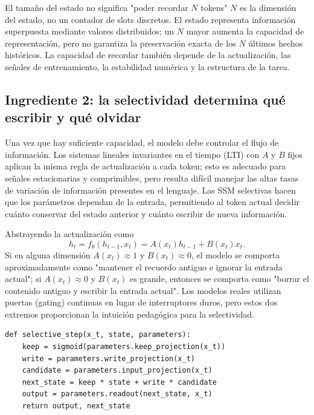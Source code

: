 \begin{knowledgebox}{El tamaño del estado no significa "poder recordar $N$ tokens"}
$N$ es la dimensión del estado, no un contador de slots discretos. El estado representa información superpuesta mediante valores distribuidos; un $N$ mayor aumenta la capacidad de representación, pero no garantiza la preservación exacta de los $N$ últimos hechos históricos. La capacidad de recordar también depende de la actualización, las señales de entrenamiento, la estabilidad numérica y la estructura de la tarea.
\end{knowledgebox}

\subsection{Ingrediente 2: la selectividad determina qué escribir y qué olvidar}

Una vez que hay suficiente capacidad, el modelo debe controlar el flujo de información. Los sistemas lineales invariantes en el tiempo (LTI) con $A$ y $B$ fijos aplican la misma regla de actualización a cada token; esto es adecuado para señales estacionarias y comprimibles, pero resulta difícil manejar las altas tasas de variación de información presentes en el lenguaje. Las SSM selectivas hacen que los parámetros dependan de la entrada, permitiendo al token actual decidir cuánto conservar del estado anterior y cuánto escribir de nueva información.


Abstrayendo la actualización como
\[
h_t=f_\theta(h_{t-1},x_t)
=A(x_t)h_{t-1}+B(x_t)x_t.
\]
Si en alguna dimensión $A(x_t)\approx 1$ y $B(x_t)\approx 0$, el modelo se comporta aproximadamente como "mantener el recuerdo antiguo e ignorar la entrada actual"; si $A(x_t)\approx 0$ y $B(x_t)$ es grande, entonces se comporta como "borrar el contenido antiguo y escribir la entrada actual". Los modelos reales utilizan puertas (gating) continuas en lugar de interruptores duros, pero estos dos extremos proporcionan la intuición pedagógica para la selectividad.

\begin{lstlisting}[caption={Pseudocódigo didáctico de la actualización recurrente selectiva}]
def selective_step(x_t, state, parameters):
    keep = sigmoid(parameters.keep_projection(x_t))
    write = parameters.write_projection(x_t)
    candidate = parameters.input_projection(x_t)
    next_state = keep * state + write * candidate
    output = parameters.readout(next_state, x_t)
    return output, next_state
\end{lstlisting}

